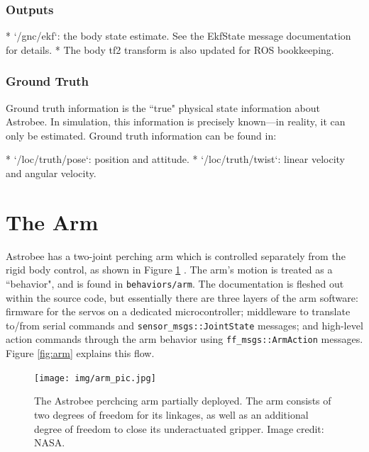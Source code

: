 \documentclass{article}
\begin{document}
\subsubsection{Outputs}
\begin{markdown}
* `/gnc/ekf`: the body state estimate. See the EkfState message documentation for details.
* The body tf2 transform is also updated for ROS bookkeeping.
\end{markdown}

\subsubsection{Ground Truth}
Ground truth information is the ``true" physical state information about Astrobee. In simulation, this information is precisely known---in reality, it can only be estimated. Ground truth information can be found in:
\begin{markdown}
* `/loc/truth/pose`: position and attitude.
* `/loc/truth/twist`: linear velocity and angular velocity.
\end{markdown}


\clearpage
\section{The Arm}

Astrobee has a two-joint perching arm which is controlled separately from the rigid body control, as shown in Figure \ref{fig:arm_pic} \cite{Park2017a}. The arm's motion is treated as a ``behavior",
and is found in \texttt{behaviors/arm}. The documentation is fleshed out within the source code, but essentially there are three layers of the arm software: firmware for the servos on a dedicated microcontroller; middleware to translate to/from serial commands and \texttt{sensor\_msgs::JointState} messages; and high-level action commands through the arm behavior using \texttt{ff\_msgs::ArmAction} messages. Figure \ref{fig:arm} explains this flow.
\\
\begin{figure}[h!]
    \centering
    \texttt{[image: img/arm\_pic.jpg]}
    \caption{The Astrobee perchcing arm partially deployed. The arm consists of two degrees of freedom for its linkages, as well as an additional degree of freedom to close its underactuated gripper. Image credit: NASA.}
    \label{fig:arm_pic}
\end{figure}
\end{document}
